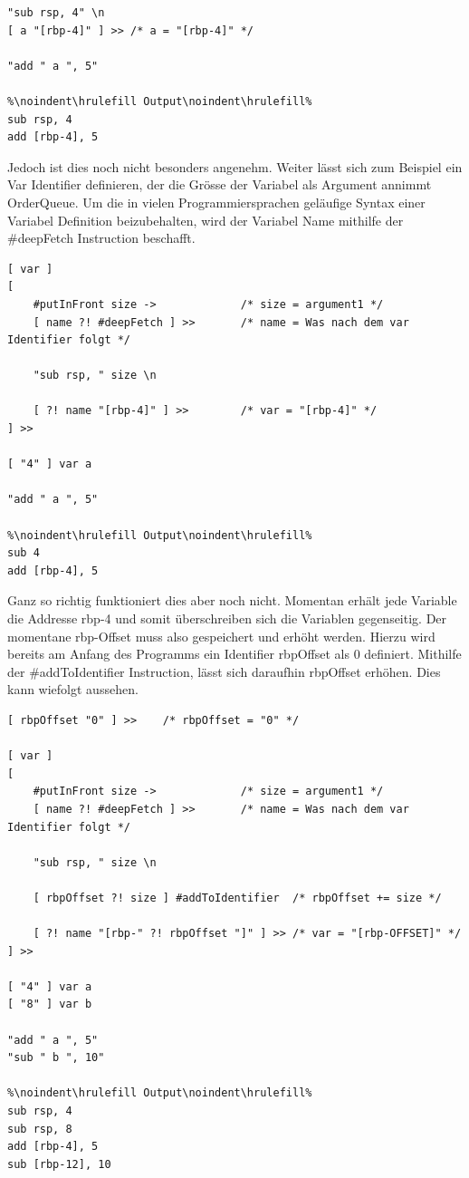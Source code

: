 \begin{lstlisting}[language=QHS, caption=Beispiel einer Variabel in QHS]
"sub rsp, 4" \n
[ a "[rbp-4]" ] >> /* a = "[rbp-4]" */

"add " a ", 5"

%\noindent\hrulefill Output\noindent\hrulefill%
sub rsp, 4
add [rbp-4], 5
\end{lstlisting}

Jedoch ist dies noch nicht besonders angenehm. Weiter lässt sich zum Beispiel ein Var Identifier definieren, der die Grösse der Variabel als Argument annimmt OrderQueue. Um die in vielen Programmiersprachen geläufige Syntax
einer Variabel Definition beizubehalten, wird der Variabel Name mithilfe der \#deepFetch Instruction beschafft.

\begin{lstlisting}[language=QHS, caption=Definition einer Variable mit var Identifier]
[ var ]
[
    #putInFront size ->             /* size = argument1 */
    [ name ?! #deepFetch ] >>       /* name = Was nach dem var Identifier folgt */

    "sub rsp, " size \n

    [ ?! name "[rbp-4]" ] >>        /* var = "[rbp-4]" */
] >> 

[ "4" ] var a 

"add " a ", 5"
    
%\noindent\hrulefill Output\noindent\hrulefill%
sub 4
add [rbp-4], 5
\end{lstlisting}

Ganz so richtig funktioniert dies aber noch nicht. Momentan erhält jede Variable die Addresse rbp-4 und somit überschreiben sich die Variablen gegenseitig. Der momentane rbp-Offset muss also gespeichert und erhöht werden.
Hierzu wird bereits am Anfang des Programms ein Identifier rbpOffset als 0 definiert. Mithilfe der \#addToIdentifier Instruction, lässt sich daraufhin rbpOffset erhöhen. Dies kann wiefolgt aussehen.

\begin{lstlisting}[language=QHS, caption=Definition einer Variable mit rbpOffset]
[ rbpOffset "0" ] >>    /* rbpOffset = "0" */

[ var ]
[
    #putInFront size ->             /* size = argument1 */
    [ name ?! #deepFetch ] >>       /* name = Was nach dem var Identifier folgt */

    "sub rsp, " size \n

    [ rbpOffset ?! size ] #addToIdentifier  /* rbpOffset += size */

    [ ?! name "[rbp-" ?! rbpOffset "]" ] >> /* var = "[rbp-OFFSET]" */
] >> 

[ "4" ] var a 
[ "8" ] var b 

"add " a ", 5"
"sub " b ", 10"
    
%\noindent\hrulefill Output\noindent\hrulefill%
sub rsp, 4
sub rsp, 8
add [rbp-4], 5
sub [rbp-12], 10
\end{lstlisting}

